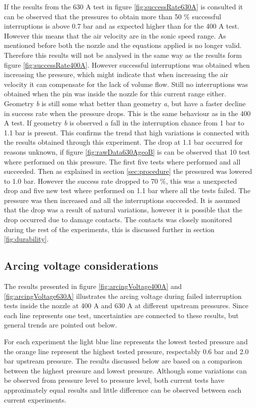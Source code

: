 \documentclass[10pt,a4paper,twoside]{article}
\begin{document}
If the results from the 630 A test in figure \ref{fig:successRate630A} is consulted it can be observed that the pressures to obtain more than 50 \% successful interruptions is above 0.7 bar and as expected higher than for the 400 A test. However this means that the air velocity are in the sonic speed range. As mentioned before both the nozzle and the equations applied is no longer valid. Therefore this results will not be analysed in the same way as the results form figure \ref{fig:successRate400A}. However successful interruptions was obtained when increasing the pressure, which might indicate that when increasing the air velocity it can compensate for the lack of volume flow. Still no interruptions was obtained when the pin was inside the nozzle for this current range either. Geometry \textit{b} is still some what better than geometry \textit{a}, but have a faster decline in success rate when the pressure drops. This is the same behaviour as in the 400 A test. If geometry \textit{b} is observed a fall in the interruption chance from 1 bar to 1.1 bar is present. This confirms the trend that high variations is connected with the results obtained through this experiment. The drop at 1.1 bar occurred for reasons unknown, if figure \ref{fig:rawData630AgeoB} is can be observed that 10 test where performed on this pressure. The first five tests where performed and all succeeded. Then as explained in section \ref{sec:procedure} the pressured was lowered to 1.0 bar. However the success rate dropped to 70 \%, this was a unexpected drop and five new test where performed on 1.1 bar where all the tests failed. The pressure was then increased and all the interruptions succeeded. It is assumed that the drop was a result of natural variations, however it is possible that the drop occurred due to damage contacts. The contacts was closely monitored during the rest of the experiments, this is discussed further in section \ref{fig:durability}.

\subsection{Arcing voltage considerations}
The results presented in figure \ref{fig:arcingVoltage400A} and \ref{fig:arcingVoltage630A} illustrates the arcing voltage during failed interruption tests inside the nozzle at 400 A and 630 A at different upstream pressures. Since each line represents one test, uncertainties are connected to these results, but general trends are pointed out below.

For each experiment the light blue line represents the lowest tested pressure and the orange line represent the highest tested pressure, respectably 0.6 bar and 2.0 bar upstream pressure. The results discussed below are based on a comparison between the highest pressure and lowest pressure. Although some variations can be observed from pressure level to pressure level, both current tests have approximately equal results and little difference can be observed between each current experiments.
\end{document}
